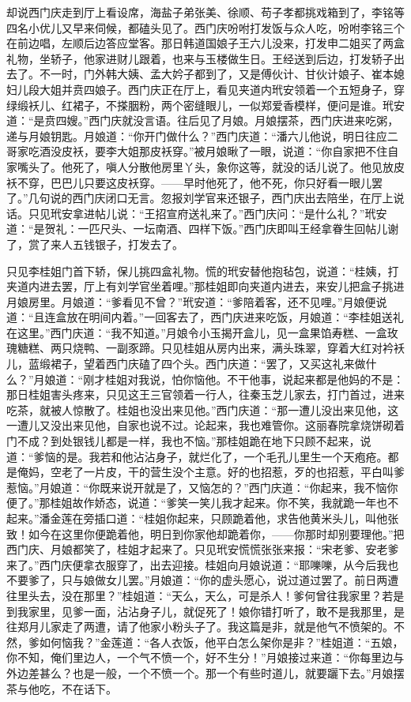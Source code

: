 却说西门庆走到厅上看设席，海盐子弟张美、徐顺、苟子孝都挑戏箱到了，李铭等四名小优儿又早来伺候，都磕头见了。西门庆吩咐打发饭与众人吃，吩咐李铭三个在前边唱，左顺后边答应堂客。那日韩道国娘子王六儿没来，打发申二姐买了两盒礼物，坐轿子，他家进财儿跟着，也来与玉楼做生日。王经送到后边，打发轿子出去了。不一时，门外韩大姨、孟大妗子都到了，又是傅伙计、甘伙计娘子、崔本媳妇儿段大姐并贲四娘子。西门庆正在厅上，看见夹道内玳安领着一个五短身子，穿绿缎袄儿、红裙子，不搽胭粉，两个密缝眼儿，一似郑爱香模样，便问是谁。玳安道：“是贲四嫂。”西门庆就没言语。往后见了月娘。月娘摆茶，西门庆进来吃粥，递与月娘钥匙。月娘道：“你开门做什么？”西门庆道：“潘六儿他说，明日往应二哥家吃酒没皮袄，要李大姐那皮袄穿。”被月娘瞅了一眼，说道：“你自家把不住自家嘴头了。他死了，嗔人分散他房里丫头，象你这等，就没的话儿说了。他见放皮袄不穿，巴巴儿只要这皮袄穿。——早时他死了，他不死，你只好看一眼儿罢了。”几句说的西门庆闭口无言。忽报刘学官来还银子，西门庆出去陪坐，在厅上说话。只见玳安拿进帖儿说：“王招宣府送礼来了。”西门庆问：“是什么礼？”玳安道：“是贺礼：一匹尺头、一坛南酒、四样下饭。”西门庆即叫王经拿眷生回帖儿谢了，赏了来人五钱银子，打发去了。

只见李桂姐门首下轿，保儿挑四盒礼物。慌的玳安替他抱毡包，说道：“桂姨，打夹道内进去罢，厅上有刘学官坐着哩。”那桂姐即向夹道内进去，来安儿把盒子挑进月娘房里。月娘道：“爹看见不曾？”玳安道：“爹陪着客，还不见哩。”月娘便说道：“且连盒放在明间内着。”一回客去了，西门庆进来吃饭，月娘道：“李桂姐送礼在这里。”西门庆道：“我不知道。”月娘令小玉揭开盒儿，见一盒果馅寿糕、一盒玫瑰糖糕、两只烧鸭、一副豕蹄。只见桂姐从房内出来，满头珠翠，穿着大红对衿袄儿，蓝缎裙子，望着西门庆磕了四个头。西门庆道：“罢了，又买这礼来做什么？”月娘道：“刚才桂姐对我说，怕你恼他。不干他事，说起来都是他妈的不是：那日桂姐害头疼来，只见这王三官领着一行人，往秦玉芝儿家去，打门首过，进来吃茶，就被人惊散了。桂姐也没出来见他。”西门庆道：“那一遭儿没出来见他，这一遭儿又没出来见他，自家也说不过。论起来，我也难管你。这丽春院拿烧饼砌着门不成？到处银钱儿都是一样，我也不恼。”那桂姐跪在地下只顾不起来，说道：“爹恼的是。我若和他沾沾身子，就烂化了，一个毛孔儿里生一个天疱疮。都是俺妈，空老了一片皮，干的营生没个主意。好的也招惹，歹的也招惹，平白叫爹惹恼。”月娘道：“你既来说开就是了，又恼怎的？”西门庆道：“你起来，我不恼你便了。”那桂姐故作娇态，说道：“爹笑一笑儿我才起来。你不笑，我就跪一年也不起来。”潘金莲在旁插口道：“桂姐你起来，只顾跪着他，求告他黄米头儿，叫他张致！如今在这里你便跪着他，明日到你家他却跪着你，——你那时却别要理他。”把西门庆、月娘都笑了，桂姐才起来了。只见玳安慌慌张张来报：“宋老爹、安老爹来了。”西门庆便拿衣服穿了，出去迎接。桂姐向月娘说道：“耶嚛嚛，从今后我也不要爹了，只与娘做女儿罢。”月娘道：“你的虚头愿心，说过道过罢了。前日两遭往里头去，没在那里？”桂姐道：“天么，天么，可是杀人！爹何曾往我家里？若是到我家里，见爹一面，沾沾身子儿，就促死了！娘你错打听了，敢不是我那里，是往郑月儿家走了两遭，请了他家小粉头子了。我这篇是非，就是他气不愤架的。不然，爹如何恼我？”金莲道：“各人衣饭，他平白怎么架你是非？”桂姐道：“五娘，你不知，俺们里边人，一个气不愤一个，好不生分！”月娘接过来道：“你每里边与外边差甚么？也是一般，一个不愤一个。那一个有些时道儿，就要躧下去。”月娘摆茶与他吃，不在话下。


